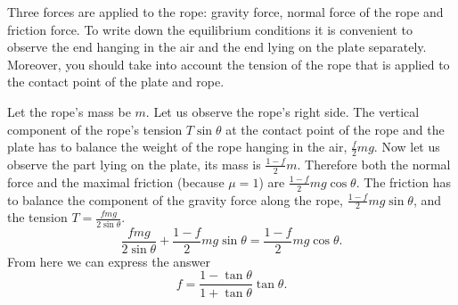 \hinteng
Three forces are applied to the rope: gravity force, normal force of the rope and friction force. To write down the equilibrium conditions it is convenient to observe the end hanging in the air and the end lying on the plate separately.  Moreover, you should take into account the tension of the rope that is applied to the contact point of the plate and rope.

\solueng
Let the rope’s mass be $m$. Let us observe the rope’s right side. The vertical component of the rope’s tension $T \sin \theta$ at the contact point of the rope and the plate has to balance the weight of the rope hanging in the air, $\frac{f}{2}mg$. Now let us observe the part lying on the plate, its mass is $\frac{1-f}{2}m$. Therefore both the normal force and the maximal friction (because $\mu = 1$) are $\frac{1-f}{2}mg \cos \theta$. The friction has to balance the component of the gravity force along the rope, $\frac{1-f}{2}mg \sin \theta$, and the tension $T=\frac{f m g}{2 \sin \theta}$. 
$$\frac{f m g}{2 \sin \theta} + \frac{1-f}{2}mg \sin \theta = \frac{1-f}{2}mg \cos \theta.$$
From here we can express the answer
$$f = \frac{1-\tan \theta}{1+\tan \theta} \tan \theta. $$
\probend